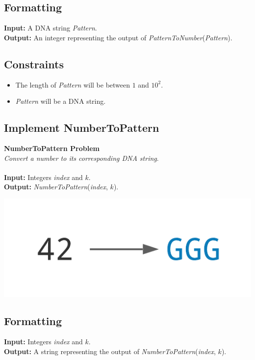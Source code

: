 \documentclass{article}
\begin{document}
\subsection*{Formatting}
\textbf{Input:} A DNA string \emph{Pattern}.\\
\noindent \textbf{Output:} An integer representing the output of \emph{PatternToNumber}(\emph{Pattern}).

\subsection*{Constraints}
\begin{itemize}
    \item The length of \emph{Pattern} will be between $1$ and $10^2$.
    \item \emph{Pattern} will be a DNA string.
\end{itemize}
\pagebreak
\subsection{Implement NumberToPattern}
\hline\vspace{5}
\noindent \textbf{NumberToPattern Problem}\\
\emph{Convert a number to its corresponding DNA string}.\\ \\
\textbf{Input:} Integers \emph{index} and $k$.\\
\textbf{Output:} \emph{NumberToPattern}(\emph{index}, $k$).
\begin{center}
    \includegraphics[scale=0.2]{c1/logos/1M.png} 
\end{center}
\hline\vspace{5}

\subsection*{Formatting}
\textbf{Input:} Integers \emph{index} and $k$.\\
\noindent \textbf{Output:} A string representing the output of \emph{NumberToPattern}(\emph{index}, $k$).
\end{document}
